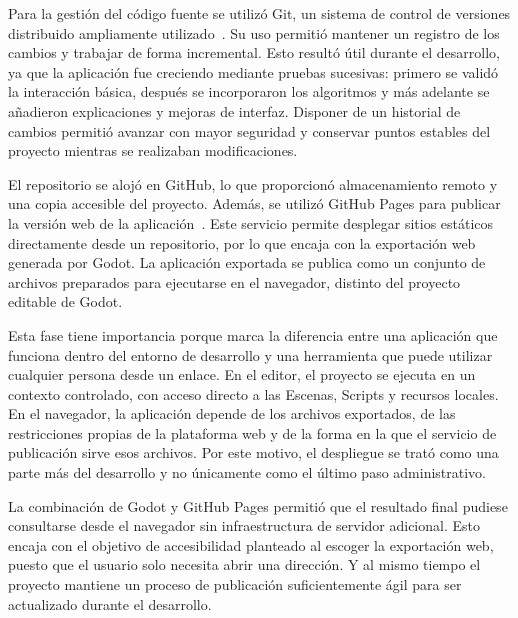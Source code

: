 Para la gestión del código fuente se utilizó Git, un sistema de control de versiones distribuido ampliamente utilizado~\cite{ProGit}.
Su uso permitió mantener un registro de los cambios y trabajar de forma incremental.
Esto resultó útil durante el desarrollo, ya que la aplicación fue creciendo mediante pruebas sucesivas: primero se validó la interacción básica, después se incorporaron los algoritmos y más adelante se añadieron explicaciones y mejoras de interfaz.
Disponer de un historial de cambios permitió avanzar con mayor seguridad y conservar puntos estables del proyecto mientras se realizaban modificaciones.

El repositorio se alojó en GitHub, lo que proporcionó almacenamiento remoto y una copia accesible del proyecto.
Además, se utilizó GitHub Pages para publicar la versión web de la aplicación~\cite{GitHubPages}.
Este servicio permite desplegar sitios estáticos directamente desde un repositorio, por lo que encaja con la exportación web generada por Godot.
La aplicación exportada se publica como un conjunto de archivos preparados para ejecutarse en el navegador, distinto del proyecto editable de Godot.

Esta fase tiene importancia porque marca la diferencia entre una aplicación que funciona dentro del entorno de desarrollo y una herramienta que puede utilizar cualquier persona desde un enlace.
En el editor, el proyecto se ejecuta en un contexto controlado, con acceso directo a las \gls{Escena}s, Scripts y recursos locales.
En el navegador, la aplicación depende de los archivos exportados, de las restricciones propias de la plataforma web y de la forma en la que el servicio de publicación sirve esos archivos.
Por este motivo, el despliegue se trató como una parte más del desarrollo y no únicamente como el último paso administrativo.

La combinación de Godot y GitHub Pages permitió que el resultado final pudiese consultarse desde el navegador sin infraestructura de servidor adicional.
Esto encaja con el objetivo de accesibilidad planteado al escoger la exportación web, puesto que el usuario solo necesita abrir una dirección.
Y al mismo tiempo el proyecto mantiene un proceso de publicación suficientemente ágil para ser actualizado durante el desarrollo.


